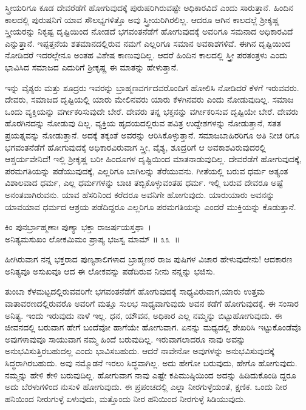 ಸ್ತ್ರೀಯರಿಗೂ ಕೂಡ ದೇವರೆಡೆಗೆ ಹೋಗುವುದಕ್ಕೆ ಪುರುಷರಿಗಿರುವಷ್ಟೇ ಅಧಿಕಾರವಿದೆ ಎಂದು ಸಾರುತ್ತಾನೆ. ಹಿಂದಿನ ಕಾಲದಲ್ಲಿ ಪುರುಷನಿಗೆ ಯಾವ ಸೌಲಭ್ಯಗಳಿತ್ತೊ ಅವು ಸ್ತ್ರೀಯರಿಗಿರಲಿಲ್ಲ. ಆದರೂ ಆಗಿನ ಕಾಲದಲ್ಲೆ ಶ‍್ರೀಕೃಷ್ಣ ಸ್ತ್ರೀಯರನ್ನು ನಿಕೃಷ್ಟ ದೃಷ್ಟಿಯಿಂದ ನೋಡದೆ ಭಗವಂತನೆಡೆಗೆ ಹೋಗುವುದಕ್ಕೆ ಅವರಿಗೂ ಸಮನಾದ ಅಧಿಕಾರವಿದೆ ಎನ್ನುತ್ತಾನೆ. ಇಪ್ಪತ್ತನೆಯ ಶತಮಾನದಲ್ಲಿರುವ ನಮಗೆ ಎಲ್ಲರಿಗೂ ಸಮಾನ ಅವಕಾಶಗಳಿವೆ. ಈಗಿನ ದೃಷ್ಟಿಯಿಂದ ನೋಡಿದರೆ ಇದರಲ್ಲೇನೂ ಅಂತಹ ವಿಶೇಷ ಕಾಣುವುದಿಲ್ಲ. ಆದರೆ ಹಿಂದಿನ ಕಾಲದಲ್ಲಿ ಸ್ತ್ರೀ ಪರತಂತ್ರಳು ಎಂದು ಭಾವಿಸಿದ ಸಮಾಜದ ಎದುರಿಗೆ ಶ‍್ರೀಕೃಷ್ಣ ಈ ಮಾತನ್ನು ಹೇಳುತ್ತಾನೆ.

ಇನ್ನು ವೈಶ್ಯರು ಮತ್ತು ಶೂದ್ರರು ಇವರನ್ನು ಬ್ರಾಹ್ಮಣವರ್ಗದವರೊಂದಿಗೆ ಹೋಲಿಸಿ ನೋಡಿ\-ದರೆ ಕೆಳಗೆ ಇರುವವರು. ದೇವರು, ಸಮಾಜದ ದೃಷ್ಟಿಯಲ್ಲಿ ಯಾರು ಮೇಲಿನವರು ಯಾರು ಕೆಳಗಿನವರು ಎಂದು ನೋಡುವುದಿಲ್ಲ. ಸಮಾಜ ಒಂದು ವ್ಯಕ್ತಿಯನ್ನು ವರ್ಗೀಕರಿಸುವುದೇ ಬೇರೆ. ದೇವರು ತನ್ನ ಭಕ್ತನನ್ನು ವರ್ಗೀಕರಿಸುವ ದೃಷ್ಟಿಯೇ ಬೇರೆ. ದೇವರು ಹೊರಗಿನದನ್ನು ನೋಡುವು ದಿಲ್ಲ. ವ್ಯಕ್ತಿಯ ಹೃದಯದಲ್ಲಿರುವ ಪವಿತ್ರ ಉದ್ದೇಶಗಳನ್ನು ನೋಡುತ್ತಾನೆ, ಸತತ ಪ್ರಯತ್ನವನ್ನು ನೋಡುತ್ತಾನೆ. ಅದಕ್ಕೆ ತಕ್ಕಂತೆ ಅವರನ್ನು ಆರಿಸಿಕೊಳ್ಳುತ್ತಾನೆ. ಸಮಾಜಬಾಹಿರರಿಗೂ ಅತಿ ನೀಚ ರಿಗೂ ಭಗವಂತನೆಡೆಗೆ ಹೋಗುವುದಕ್ಕೆ ಅಧಿಕಾರವಿರುವಾಗ ಸ್ತ್ರೀ, ವೈಶ್ಯ, ಶೂದ್ರರಿಗೆ ಆ ಅವಕಾಶವಿರುವುದರಲ್ಲಿ ಆಶ್ಚರ್ಯವೇನಿದೆ! ಇಲ್ಲಿ ಶ‍್ರೀಕೃಷ್ಣ ಬರೀ ಹಿಂದೂಗಳ ದೃಷ್ಟಿಯಿಂದ ಮಾತನಾಡುವುದಿಲ್ಲ. ದೇವರೆಡೆಗೆ ಹೋಗುವುದಕ್ಕೆ, ಪರಮಗತಿಯನ್ನು ಪಡೆಯುವುದಕ್ಕೆ, ಎಲ್ಲರಿಗೂ ಬಾಗಿಲನ್ನು ತೆರೆಯುವನು. ಗೀತೆಯಲ್ಲಿ ಬರುವ ಧರ್ಮ ಅತ್ಯಂತ ವಿಶಾಲವಾದ ಧರ್ಮ, ಎಲ್ಲ ಧರ್ಮಗಳನ್ನು ಬಾಚಿ ತಬ್ಬಿಕೊಳ್ಳುವಂತಹ ಧರ್ಮ. ಇಲ್ಲಿ ಬರುವ ದೇವರೂ ಅಷ್ಟೆ ಅನಂತವಾಗಿರುವನು. ಯಾವ ಹೆಸರಿನಿಂದ ಕರೆದರೂ ಅವನಿಗೇ ಹೋಗುವುದು. ಯಾರುಯಾರು ಅವನನ್ನು ಯಾವಯಾವ ಧರ್ಮದ ಆಶ್ರಯ ಪಡೆದಿದ್ದರೂ ಎಲ್ಲರಿಗೂ ಪರಮಗತಿಯನ್ನು ಎಂದರೆ ಮುಕ್ತಿಯನ್ನು ಕೊಡುತ್ತಾನೆ.

\begin{shloka}
ಕಿಂ ಪುನರ್ಬ್ರಾಹ್ಮಣಾಃ ಪುಣ್ಯಾ ಭಕ್ತಾ ರಾಜರ್ಷಯಸ್ತಥಾ~।\\ಅನಿತ್ಯಮಸುಖಂ ಲೋಕಮಿಮಂ ಪ್ರಾಪ್ಯ ಭಜಸ್ವ ಮಾಮ್ \hfill॥ ೩೩~॥
\end{shloka}

\begin{artha}
ಹೀಗಿರುವಾಗ ನನ್ನ ಭಕ್ತರಾದ ಪುಣ್ಯಶಾಲಿಗಳಾದ ಬ್ರಾಹ್ಮಣರ ರಾಜ ಪುಷಿಗಳ ವಿಚಾರ ಹೇಳುವುದೇನು! ಆದಕಾರಣ ಅನಿತ್ಯವೂ ಅಸುಖವೂ ಆದ ಈ ಲೋಕವನ್ನು ಪಡೆದಿರುವ ನೀನು ನನ್ನನ್ನು ಭಜಿಸು.
\end{artha}

ತುಂಬಾ ಕೆಳಮಟ್ಟದಲ್ಲಿರುವವರಿಗೇ ಭಗವಂತನೆಡೆಗೆ ಹೋಗುವುದಕ್ಕೆ ಸಾಧ್ಯವಿರುವಾಗ,\break ಯಾರು ಉತ್ತಮ ವಾತಾವರಣದಲ್ಲಿರುವರೊ ಅವರಿಗೆ ಮತ್ತೂ ಸುಲಭ ಸಾಧ್ಯವಾಗುವುದು ಅವನ ಕಡೆಗೆ ಹೋಗುವುದಕ್ಕೆ. ಈ ಸಂಸಾರ ಅನಿತ್ಯ. ಇಂದು ಇರುವುದು ನಾಳೆ ಇಲ್ಲ. ಧನ, ಯೌವನ, ಅಧಿಕಾರ ಎಲ್ಲ ನಮ್ಮನ್ನು ಬಿಟ್ಟುಹೋಗುವುದು. ಈ ಜೀವನದಲ್ಲಿ ಬರುವಾಗ ಹೇಗೆ ಬಂದೆವೋ ಹಾಗೆಯೇ ಹೋಗುವಾಗ. ಏನನ್ನು ಮಧ್ಯದಲ್ಲಿ ಶೇಖರಿಸಿ ಇಟ್ಟುಕೊಂಡೆವೊ ಅವುಗಳಾವುವೂ ಸಾಯುವಾಗ ನಮ್ಮ ಹಿಂದೆ ಬರುವುದಿಲ್ಲ. ಇರುವಾಗಲಾದರೂ ನಾವು ಅವನ್ನು ಅನುಭವಿಸುತ್ತಿರಬಹುದಲ್ಲ ಎಂದು ಭಾವಿಸಬಹುದು. ಆದರೆ ನಾವೇನೋ ಅವುಗಳನ್ನು ಅನುಭವಿ\-ಸುವುದಕ್ಕೆ ಸಿದ್ಧರಾಗಿರಬಹುದು. ಅವು ನಮ್ಮೊಡನೆ ಇರಲು ಸಿದ್ಧವಾಗಿಲ್ಲ. ಅದು ಹೇಗೋ ಬರುವುದು, ಹೇಗೊ ಹೋಗುವುದು. ನಮ್ಮನ್ನು ಹೇಳಿ ಕೇಳಿ ಬರುವುದಿಲ್ಲ. ಹೋಗುವಾಗ ನಾವು ಎಷ್ಟೇ ಕಪಿಮುಷ್ಠಿಯಿಂದ ಅದನ್ನು ಹಿಡಿದುಕೊಂಡಿ ದ್ದರೂ ಅದು ಬೆರಳುಗಳಿಂದ ನುಸುಳಿ ಹೋಗುವುದು. ಈ ಪ್ರಪಂಚದಲ್ಲಿ ಎಲ್ಲಾ ನೀರಗುಳ್ಳೆಯಂತೆ, ಕ್ಷಣಿಕ. ಒಂದು ನೀರ ಹನಿಯಿಂದ ನೀರುಗುಳ್ಳೆ ಏಳುವುದು, ಮತ್ತೊಂದು ನೀರ ಹನಿಯಿಂದ ನೀರಗುಳ್ಳೆ ಸಿಡಿಯುವುದು.

